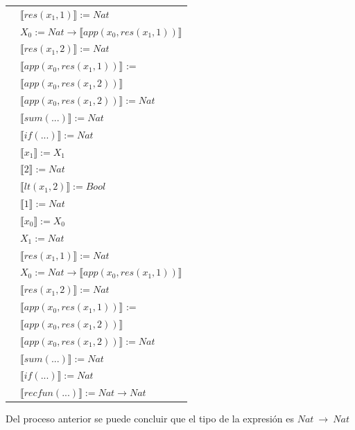 \begin{exercise}
\begin{description}
\begin{center}
\begin{longtable}[!h]{ | l | l | }
			     & $ \llbracket res(x_1,1) \rrbracket := Nat$\\
			     & $X_0 := Nat \to  \llbracket app(x_0, res(x_1,1)) \rrbracket$\\
			     & $ \llbracket res(x_1,2) \rrbracket := Nat$ \\
			     & $ \llbracket app(x_0, res(x_1,1)) \rrbracket$ := \\
			     & $ \llbracket app(x_0, res(x_1,2)) \rrbracket$\\ 
			     & $ \llbracket app(x_0, res(x_1,2)) \rrbracket := Nat$ \\
			     & $ \llbracket sum(...) \rrbracket := Nat$ \\
			     & $ \llbracket if(...) \rrbracket := Nat$  \\
                     \hline 
			     & $ \llbracket x_1 \rrbracket := X_1$\\
                        & $ \llbracket 2 \rrbracket := Nat$\\ 
                        & $ \llbracket lt(x_1 , 2) \rrbracket := Bool$\\  
			     & $ \llbracket 1 \rrbracket := Nat$\\
			     & $ \llbracket x_0 \rrbracket := X_0$\\
			     & $X_1 := Nat$\\
			     &  $ \llbracket res(x_1,1) \rrbracket := Nat$\\
			     &  $X_0 := Nat \to  \llbracket app(x_0, res(x_1,1)) \rrbracket$\\
			     & $ \llbracket res(x_1,2) \rrbracket := Nat$ \\
			     & $ \llbracket app(x_0, res(x_1,1)) \rrbracket$ := \\
			     & $ \llbracket app(x_0, res(x_1,2)) \rrbracket$\\ 
			     & $ \llbracket app(x_0, res(x_1,2)) \rrbracket := Nat$ \\
			     & $ \llbracket sum(...) \rrbracket := Nat$ \\
			     & $ \llbracket if(...) \rrbracket := Nat$  \\
                      	     & $ \llbracket recfun(...) \rrbracket :=   Nat  \to  Nat $\\ 
                    \hline
                \end{longtable}
            \end{center}
            Del proceso anterior se puede concluir que el tipo de la expresión es $Nat \ \to \ Nat$
        \end{description}
    \end{exercise}
    
